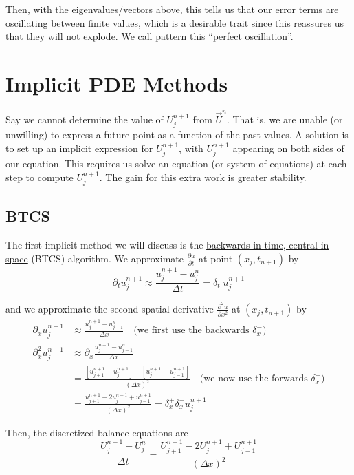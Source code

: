 \documentclass[12pt]{article}
\newlength\tindent
\renewcommand{\indent}{\hspace*{\tindent}}
\begin{document}
\indent Then, with the eigenvalues/vectors above, this tells us that our error terms are oscillating between finite values, which is a desirable trait since this reassures us that they will not explode. We call pattern this ``perfect oscillation''. 

\section{Implicit PDE Methods}

\indent Say we cannot determine the value of $U^{n + 1}_j$ from $\vec{U}^n$. That is, we are unable (or unwilling) to express a future point as a function of the past values. A solution is to set up an implicit expression for $U^{n + 1}_j$, with $U^{n + 1}_j$ appearing on both sides of our equation. This requires us solve an equation (or system of equations) at each step to compute $U^{n + 1}_j$. The gain for this extra work is greater stability.

\subsection{BTCS}

\indent The first implicit method we will discuss is the \underline{backwards in time, central in space} (BTCS) algorithm. We approximate $\frac{\partial u}{\partial t}$ at point $(x_j, t_{n + 1})$ by 
\begin{equation*}
	\partial_t u^{n+1}_j \approx \frac{ u^{n + 1}_j - u^n_j }{ \Delta t } = \delta^-_t u^{n + 1}_j
\end{equation*}

and we approximate the second spatial derivative $\frac{ \partial^2 u }{ \partial x^2 }$ at $(x_j, t_{n + 1})$ by
\begin{align*}
	\partial_x u^{n + 1}_j &\approx \frac{ u^{n + 1}_j - u^n_{j - 1} }{ \Delta x } \quad \text{(we first use the backwards $\delta^-_x$)} \\
	\partial^2_x u^{n + 1}_j &\approx \partial_x \frac{ u^{n + 1}_j - u^n_{j - 1} }{ \Delta x } \\
	&= \frac{ [u^{n + 1}_{j + 1} - u^{n + 1}_j] - [u^{n + 1}_j - u^{n + 1}_{j - 1}] }{ (\Delta x)^2 } \quad \text{(we now use the forwards $\delta^+_x$)} \\
	&= \frac{ u^{n + 1}_{j + 1} - 2u^{n + 1}_j + u^{n + 1}_{j - 1} }{ (\Delta x)^2 } = \delta^+_x\delta^-_x u^{n + 1}_j
\end{align*}

Then, the discretized balance equations are
\begin{equation*}
	\frac{ U^{n + 1}_j - U^n_j }{ \Delta t } = \frac{ U^{n + 1}_{j + 1} - 2U^{n + 1}_j + U^{n + 1}_{j - 1} }{ (\Delta x)^2 }
\end{equation*}
\end{document}
